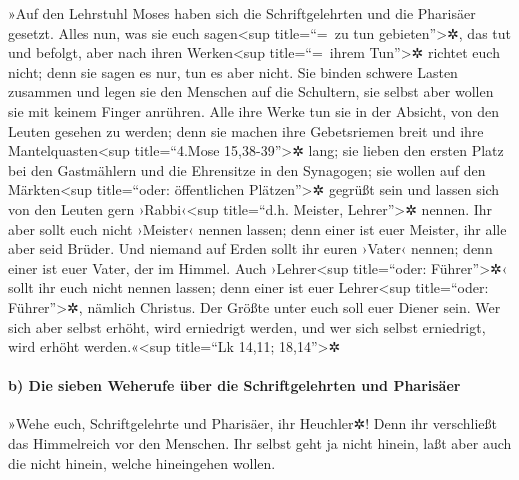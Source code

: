  »Auf den Lehrstuhl Moses haben sich die Schriftgelehrten
und die Pharisäer gesetzt.  Alles nun, was sie euch
sagen\textless sup title=``=~zu tun gebieten''\textgreater✲, das tut und
befolgt, aber nach ihren Werken\textless sup title=``=~ihrem
Tun''\textgreater✲ richtet euch nicht; denn sie sagen es nur, tun es
aber nicht.  Sie binden schwere Lasten zusammen und legen
sie den Menschen auf die Schultern, sie selbst aber wollen sie mit
keinem Finger anrühren.  Alle ihre Werke tun sie in der
Absicht, von den Leuten gesehen zu werden; denn sie machen ihre
Gebetsriemen breit und ihre Mantelquasten\textless sup title=``4.Mose
15,38-39''\textgreater✲ lang;  sie lieben den ersten Platz
bei den Gastmählern und die Ehrensitze in den Synagogen; 
sie wollen auf den Märkten\textless sup title=``oder: öffentlichen
Plätzen''\textgreater✲ gegrüßt sein und lassen sich von den Leuten gern
›Rabbi‹\textless sup title=``d.h. Meister, Lehrer''\textgreater✲ nennen.
 Ihr aber sollt euch nicht ›Meister‹ nennen lassen; denn
einer ist euer Meister, ihr alle aber seid Brüder.  Und
niemand auf Erden sollt ihr euren ›Vater‹ nennen; denn einer ist euer
Vater, der im Himmel.  Auch ›Lehrer\textless sup
title=``oder: Führer''\textgreater✲‹ sollt ihr euch nicht nennen lassen;
denn einer ist euer Lehrer\textless sup title=``oder:
Führer''\textgreater✲, nämlich Christus.  Der Größte
unter euch soll euer Diener sein.  Wer sich aber selbst
erhöht, wird erniedrigt werden, und wer sich selbst erniedrigt, wird
erhöht werden.«\textless sup title=``Lk 14,11; 18,14''\textgreater✲

\hypertarget{b-die-sieben-weherufe-uxfcber-die-schriftgelehrten-und-pharisuxe4er}{%
\paragraph{b) Die sieben Weherufe über die Schriftgelehrten und
Pharisäer}\label{b-die-sieben-weherufe-uxfcber-die-schriftgelehrten-und-pharisuxe4er}}

 »Wehe euch, Schriftgelehrte und Pharisäer, ihr
Heuchler✲! Denn ihr verschließt das Himmelreich vor den Menschen. Ihr
selbst geht ja nicht hinein, laßt aber auch die nicht hinein, welche
hineingehen wollen.

